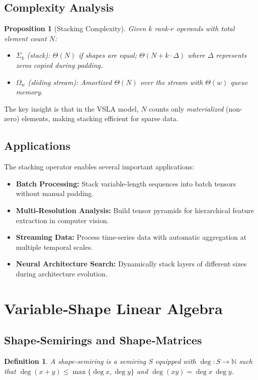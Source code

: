 \documentclass[11pt]{article}
\newtheorem{proposition}[theorem]{Proposition}
\newtheorem{definition}[theorem]{Definition}
\begin{document}
\subsection{Complexity Analysis}

\begin{proposition}[Stacking Complexity]
Given $k$ rank-$r$ operands with total element count $N$:
\begin{itemize}
\item $\Sigma_k$ (stack): $\Theta(N)$ if shapes are equal; $\Theta(N + k \cdot \Delta)$ where $\Delta$ represents zeros copied during padding.
\item $\Omega_w$ (sliding stream): Amortized $\Theta(N)$ over the stream with $\Theta(w)$ queue memory.
\end{itemize}
\end{proposition}

The key insight is that in the VSLA model, $N$ counts only \emph{materialized} (non-zero) elements, making stacking efficient for sparse data.

\subsection{Applications}

The stacking operator enables several important applications:

\begin{itemize}
\item \textbf{Batch Processing:} Stack variable-length sequences into batch tensors without manual padding.
\item \textbf{Multi-Resolution Analysis:} Build tensor pyramids for hierarchical feature extraction in computer vision.
\item \textbf{Streaming Data:} Process time-series data with automatic aggregation at multiple temporal scales.
\item \textbf{Neural Architecture Search:} Dynamically stack layers of different sizes during architecture evolution.
\end{itemize}

\section{Variable‑Shape Linear Algebra}
\label{sec:vsla}
\subsection{Shape‑Semirings and Shape‑Matrices}
\begin{definition}
A \emph{shape‑semiring} is a semiring $S$ equipped with $\deg\colon S\to\mathbb N$ such that $\deg(x+y)\le\max\{\deg x,\deg y\}$ and $\deg(xy)=\deg x\,\deg y$.
\end{definition}
\end{document}
